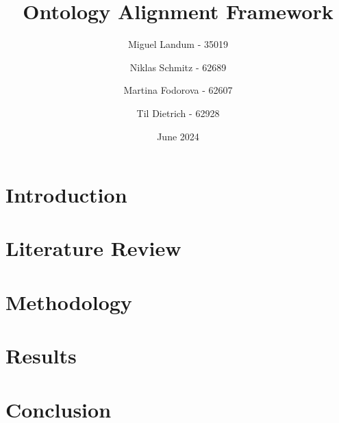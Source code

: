 \documentclass[11pt, format=acmtog, screen=True, natbib=false, nonacm=true]{acmart}
\title{Ontology Alignment Framework}
\author{Miguel Landum - 35019}
\author{Niklas Schmitz - 62689}
\author{Martina Fodorova - 62607}
\author{Til Dietrich - 62928}
\date{June 2024}
\begin{document}
\maketitle

\section{Introduction} \label{introduction}

\section{Literature Review} \label{literature_review}

\section{Methodology} \label{methodology}

\section{Results} \label{results}

\section{Conclusion} \label{onclusion}

\printbibliography
\end{document}
